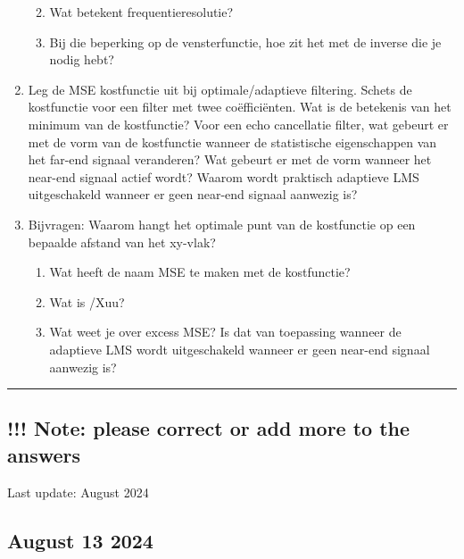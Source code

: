 \documentclass[
  a4paper,
  ,captions=tableheading
]{scrartcl}
\providecommand{\tightlist}{%
  \setlength{\itemsep}{0pt}\setlength{\parskip}{0pt}}
\begin{document}
\begin{enumerate}
  \begin{enumerate}
  \def\labelenumii{\arabic{enumii}.}
  \tightlist
  \item
    Wat betekent frequentieresolutie?\\
  \item
    Bij die beperking op de vensterfunctie, hoe zit het met de inverse
    die je nodig hebt?\\
  \end{enumerate}
\item
  Leg de MSE kostfunctie uit bij optimale/adaptieve filtering. Schets de
  kostfunctie voor een filter met twee coëfficiënten. Wat is de
  betekenis van het minimum van de kostfunctie? Voor een echo
  cancellatie filter, wat gebeurt er met de vorm van de kostfunctie
  wanneer de statistische eigenschappen van het far-end signaal
  veranderen? Wat gebeurt er met de vorm wanneer het near-end signaal
  actief wordt? Waarom wordt praktisch adaptieve LMS uitgeschakeld
  wanneer er geen near-end signaal aanwezig is?\\
\item
  Bijvragen: Waarom hangt het optimale punt van de kostfunctie op een
  bepaalde afstand van het xy-vlak?

  \begin{enumerate}
  \def\labelenumii{\arabic{enumii}.}
  \tightlist
  \item
    Wat heeft de naam MSE te maken met de kostfunctie?\\
  \item
    Wat is /Xuu?\\
  \item
    Wat weet je over excess MSE? Is dat van toepassing wanneer de
    adaptieve LMS wordt uitgeschakeld wanneer er geen near-end signaal
    aanwezig is?
  \end{enumerate}
\end{enumerate}

\begin{center}\rule{0.5\linewidth}{0.5pt}\end{center}

\subsection{!!! Note: please correct or add more to the
answers}\label{note-please-correct-or-add-more-to-the-answers}

Last update: August 2024

\subsection{August 13 2024}\label{august-13-2024}
\end{document}
